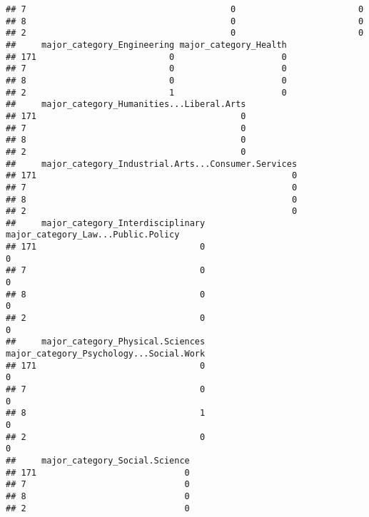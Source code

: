 \documentclass[
]{article}
\begin{document}
\begin{verbatim}
## 7                                        0                        0
## 8                                        0                        0
## 2                                        0                        0
##     major_category_Engineering major_category_Health
## 171                          0                     0
## 7                            0                     0
## 8                            0                     0
## 2                            1                     0
##     major_category_Humanities...Liberal.Arts
## 171                                        0
## 7                                          0
## 8                                          0
## 2                                          0
##     major_category_Industrial.Arts...Consumer.Services
## 171                                                  0
## 7                                                    0
## 8                                                    0
## 2                                                    0
##     major_category_Interdisciplinary major_category_Law...Public.Policy
## 171                                0                                  0
## 7                                  0                                  0
## 8                                  0                                  0
## 2                                  0                                  0
##     major_category_Physical.Sciences major_category_Psychology...Social.Work
## 171                                0                                       0
## 7                                  0                                       0
## 8                                  1                                       0
## 2                                  0                                       0
##     major_category_Social.Science
## 171                             0
## 7                               0
## 8                               0
## 2                               0
\end{verbatim}
\end{document}
